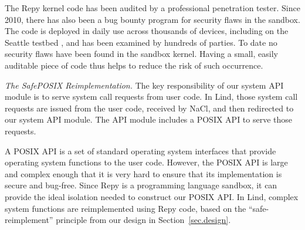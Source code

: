 

The Repy kernel code has been
audited by a professional penetration tester.  Since 2010, there has also been
a bug bounty program for security flaws in the sandbox.
The code is deployed in daily use across thousands of devices,
including on the Seattle testbed \cite{seattle}, and has been examined by
hundreds of parties.
To date no security flaws have been found in the sandbox kernel.
Having a small, easily auditable piece of code thus helps to reduce the
risk of such occurrence.

\textit{The SafePOSIX Reimplementation.}
The key responsibility of our system API module is to serve system call requests from user code.
In Lind, those system call requests are issued from the user code,
received by NaCl, and then redirected to our system API module.
The API module includes a POSIX API to serve those requests.

A POSIX API is a set of standard operating system interfaces that provide operating system functions
to the user code. However, the POSIX API is large and complex enough that it is
very hard to ensure that its implementation is secure and bug-free.
%
Since Repy is a programming language sandbox, it can provide the ideal isolation
needed to construct our POSIX API. In Lind,
complex system functions are reimplemented using Repy code,
based on the ``safe-reimplement'' principle from our design in Section~{\ref{sec.design}}.

